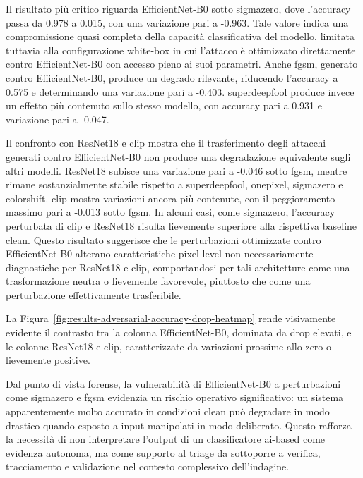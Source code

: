 Il risultato più critico riguarda EfficientNet-B0 sotto \gls{sigmazero}, dove
l'accuracy passa da 0.978 a 0.015, con una variazione pari a -0.963. Tale valore
indica una compromissione quasi completa della capacità classificativa del
modello, limitata tuttavia alla configurazione white-box in cui l'attacco è
ottimizzato direttamente contro EfficientNet-B0 con accesso pieno ai suoi
parametri. Anche \gls{fgsm}, generato contro EfficientNet-B0, produce un degrado
rilevante, riducendo l'accuracy a 0.575 e determinando una variazione pari a
-0.403. \gls{superdeepfool} produce invece un effetto più contenuto sullo stesso
modello, con accuracy pari a 0.931 e variazione pari a -0.047.

Il confronto con ResNet18 e \gls{clip} mostra che il trasferimento degli attacchi
generati contro EfficientNet-B0 non produce una degradazione equivalente sugli
altri modelli. ResNet18 subisce una variazione pari a -0.046 sotto \gls{fgsm},
mentre rimane sostanzialmente stabile rispetto a \gls{superdeepfool},
\gls{onepixel}, \gls{sigmazero} e \gls{colorshift}. \gls{clip} mostra variazioni
ancora più contenute, con il peggioramento massimo pari a -0.013 sotto
\gls{fgsm}. In alcuni casi, come \gls{sigmazero}, l'accuracy perturbata di
\gls{clip} e ResNet18 risulta lievemente superiore alla rispettiva baseline
clean. Questo risultato suggerisce che le perturbazioni ottimizzate contro
EfficientNet-B0 alterano caratteristiche pixel-level non necessariamente
diagnostiche per ResNet18 e \gls{clip}, comportandosi per tali architetture come
una trasformazione neutra o lievemente favorevole, piuttosto che come una
perturbazione effettivamente trasferibile.

La Figura~\ref{fig:results-adversarial-accuracy-drop-heatmap} rende
visivamente evidente il contrasto tra la colonna EfficientNet-B0, dominata da
drop elevati, e le colonne ResNet18 e \gls{clip}, caratterizzate da variazioni
prossime allo zero o lievemente positive.

Dal punto di vista forense, la vulnerabilità di EfficientNet-B0 a perturbazioni
come \gls{sigmazero} e \gls{fgsm} evidenzia un rischio operativo significativo:
un sistema apparentemente molto accurato in condizioni clean può degradare in
modo drastico quando esposto a input manipolati in modo deliberato. Questo
rafforza la necessità di non interpretare l'output di un classificatore
\gls{ai}-based come evidenza autonoma, ma come supporto al triage da sottoporre
a verifica, tracciamento e validazione nel contesto complessivo dell'indagine.

